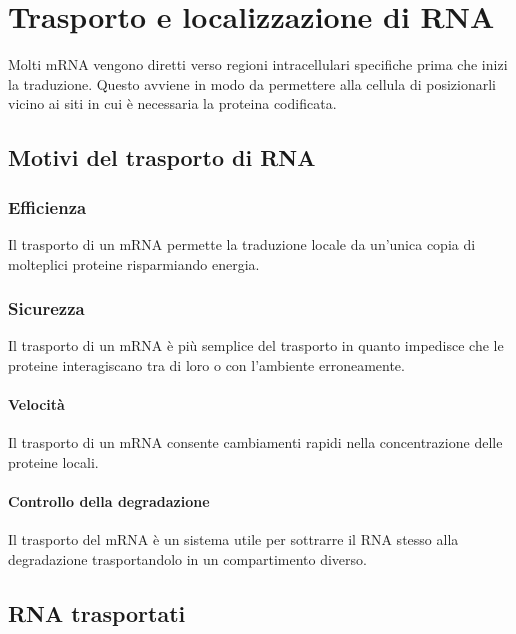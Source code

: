 \chapter{Trasporto e localizzazione di RNA}
Molti mRNA vengono diretti verso regioni intracellulari specifiche prima che inizi la traduzione.
Questo avviene in modo da permettere alla cellula di posizionarli vicino ai siti in cui \`e necessaria la proteina codificata.

\section{Motivi del trasporto di RNA}

	\subsection{Efficienza}
	Il trasporto di un mRNA permette la traduzione locale da un'unica copia di molteplici proteine risparmiando energia.

	\subsection{Sicurezza}
	Il trasporto di un mRNA \`e pi\`u semplice del trasporto in quanto impedisce che le proteine interagiscano tra di loro o con l'ambiente erroneamente.

	\subsubsection{Velocit\`a}
	Il trasporto di un mRNA consente cambiamenti rapidi nella concentrazione delle proteine locali.

	\subsubsection{Controllo della degradazione}
	Il trasporto del mRNA \`e un sistema utile per sottrarre il RNA stesso alla degradazione trasportandolo in un compartimento diverso.

\section{RNA trasportati}

